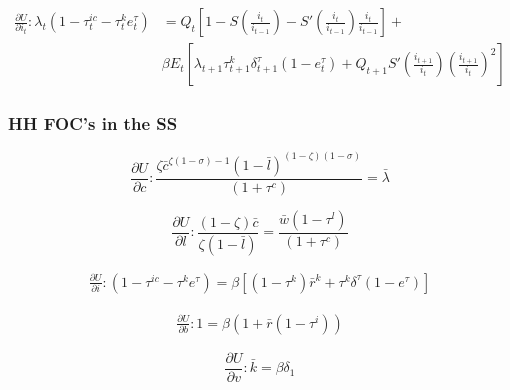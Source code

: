 \documentclass[article,11pt,letterpaper,fleqn]{article}
\theoremstyle{definition}
\numberwithin{equation}{section}
\begin{document}
\begin{equation}
\begin{split}
\frac{\partial U}{\partial i_{t}}: \lambda_{t}(1-\tau_{t}^{ic}-\tau_{t}^{k}e_{t}^{\tau}) & = Q_{t}\left[1-S\left(\frac{i_{t}}{i_{t-1}}\right)-S'\left(\frac{i_{t}}{i_{t-1}}\right)\frac{i_{t}}{i_{t-1}} \right] + \\
&  \beta E_{t}\left[\lambda_{t+1}\tau_{t+1}^{k}\delta_{t+1}^{\tau}(1-e_{t}^{\tau}) + Q_{t+1}S'\left(\frac{i_{t+1}}{i_{t}}\right)\left(\frac{i_{t+1}}{i_{t}}\right)^{2}\right]
\end{split}
\end{equation}



\subsubsection{HH FOC's in the SS}

\begin{equation}
\frac{\partial U}{\partial c}:\frac{\zeta \bar{c}^{\zeta(1-\sigma)-1}(1-\bar{l})^{(1-\zeta)(1-\sigma)}}{(1+\tau^{c})} = \bar{\lambda}
\end{equation}

\begin{equation}
\frac{\partial U}{\partial l}: \frac{(1-\zeta)\bar{c}}{\zeta (1-\bar{l})} = \frac{\bar{w}(1-\tau^{l})}{(1+\tau^{c})}
\end{equation}


 \begin{equation}
\begin{split}
\frac{\partial U}{\partial i}:\left(1-\tau^{ic}-\tau^{k}e^{\tau}\right) = \beta \left[(1-\tau^{k})\bar{r}^{k}+ \tau^{k}\delta^{\tau}(1-e^{\tau})\right]
 \end{split}
  \end{equation}


\begin{equation}
\begin{split}
\frac{\partial U}{\partial b}: 1 = \beta(1+\bar{r}(1-\tau^{i}))
\end{split}
\end{equation}

\begin{equation}
\frac{\partial U}{\partial v}: \bar{k} = \beta \delta_{1}
\end{equation}
\end{document}
